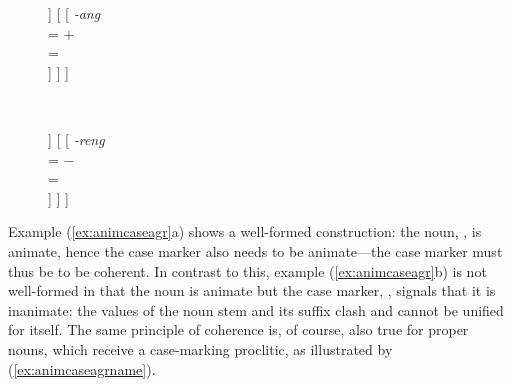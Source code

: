 \begin{figure}
\ex\label{ex:animcaseagr}
\begin{minipage}[t]{.5\remaining}
\tl\quad\label{ex:animok} %
\begin{forest}
[\anno{\xhead{N}}
	[\anno{N\tsub{stem}}
		[{%
			\textit{gan} \\
			\ups{\Anim} = $+$ \\
		}]
	]
	[
		[{%
			\textit{-ang} \\
			\ups{\Anim} = $+$ \\
			\ups{\Case} = \Aarg{} \\
		}]
	]
]
\end{forest}
\end{minipage}
~
\begin{minipage}[t]{.5\remaining}
\tl\quad\label{ex:animclash} %
\ljudge*\begin{forest}
[\anno{\xhead{N}}
	[\anno{N\tsub{stem}}
		[{%
			\textit{gan} \\
			\ups{\Anim} = $+$ \\
		}]
	]
	[
		[{%
			\textit{-reng} \\
			\ups{\Anim} = $-$ \\
			\ups{\Case} = \Aarg{} \\
		}]
	]
]
\end{forest}
\end{minipage}
\xe
\end{figure}

Example (\ref{ex:animcaseagr}a) shows a well-formed construction: the noun,
, is animate, hence the case marker also needs to be 
animate---the case marker must thus be  to be coherent. In
contrast to this, example (\ref{ex:animcaseagr}b) is not well-formed in that
the noun is animate but the case marker, , signals that it
is inanimate: the \Anim{} values of the noun stem and its suffix clash and
cannot be unified for  itself. The same principle of
coherence is, of course, also true for proper nouns, which receive a
case-marking proclitic, as illustrated by (\ref{ex:animcaseagrname}).

